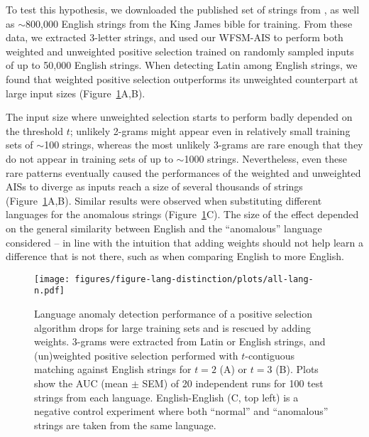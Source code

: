 \documentclass{llncs}
\begin{document}
To test this hypothesis, we downloaded the published set of strings from \cite{Wortel2020t}, 
as well as $\sim$800,000 English strings from the King James bible for training.
From these data, we extracted 3-letter strings, and used our WFSM-AIS to perform both weighted 
and unweighted positive selection trained on randomly sampled inputs of up to 50,000 English 
 strings. When detecting Latin among English strings, we found that weighted 
positive selection outperforms %
its unweighted counterpart at large input sizes (Figure~\ref{figurelang}A,B). 

The input size where unweighted selection starts to perform badly depended on the 
threshold $t$; unlikely 2-grams might appear even in 
relatively small training sets of $\sim$100 strings, whereas the most unlikely 3-grams 
are rare enough that they do not appear in training sets of up to $\sim$1000 strings.
Nevertheless, even these rare patterns eventually caused the performances of the 
weighted and unweighted AISs to 
diverge as inputs reach a size of several thousands of strings (Figure~\ref{figurelang}A,B). 
Similar results were observed when substituting different languages for the 
anomalous strings (Figure~\ref{figurelang}C). The size of the effect depended on the 
general similarity between English and the ``anomalous'' language considered -- in line
with the intuition that adding weights should not help learn a difference that is not 
there, such as when comparing English to more English. %

\begin{figure}[t]
  \centering
   \texttt{[image: figures/figure-lang-distinction/plots/all-lang-n.pdf]}
   \caption{ 
   Language anomaly detection performance of a positive selection algorithm drops for 
   large training sets and is rescued by adding weights. 3-grams were extracted from 
   Latin or English strings, and (un)weighted positive selection performed  with 
   $t$-contiguous matching against English strings for  $t=2$ (A) or $t=3$ (B). 
   Plots show the AUC (mean $\pm$ SEM) of 20 independent runs for 100 test strings 
   from each language. 	English-English (C, top left) is a negative control experiment 
	where both ``normal'' and ``anomalous''
	strings are taken from the same language.
  }
  \label{figurelang}
\end{figure}
\end{document}
